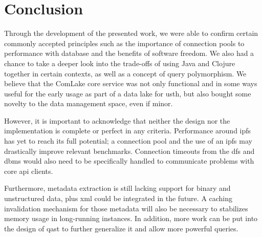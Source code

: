 \chapter{Conclusion}
Through the development of the presented work, we were able to confirm
certain commonly accepted principles such as the importance of connection pools
to performance with database and the benefits of software freedom.  We also
had a chance to take a deeper look into the trade-offs of using Java and Clojure
together in certain contexts, as well as a concept of query polymorphism.
We believe that the ComLake core service was not only functional and in
some ways useful for the early usage as part of a data lake for \gls{usth},
but also bought some novelty to the data management space, even if minor.

However, it is important to acknowledge that neither the design
nor the implementation is complete or perfect in any criteria.  Performance
around \gls{ipfs} has yet to reach its full potential; a connection pool
and the use of an \gls{ipfs} may drastically improve relevant benchmarks.
Connection timeouts from the \gls{dfs} and \gls{dbms} would also need to be
specifically handled to communicate problems with core \gls{api} clients.

Furthermore, metadata extraction is still lacking support for binary
and unstructured data, plus \gls{xml} could be integrated in the future.
A caching invalidation mechanism for those metadata will also be necessary
to stabilizes memory usage in long-running instances.  In addition,
more work can be put into the design of \gls{qast} to further generalize it
and allow more powerful queries.
